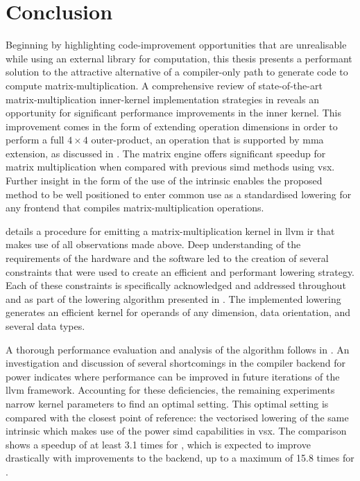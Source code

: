 \documentclass[\main/thesis.tex]{subfiles}
\begin{document}
\chapter{Conclusion}
\label{cha:conclusion}
Beginning by highlighting code-improvement opportunities that are unrealisable while using an external library for computation, this thesis presents a performant solution to the attractive alternative of a compiler-only path to generate code to compute matrix-multiplication.
A comprehensive review of state-of-the-art matrix-multiplication inner-kernel implementation strategies in  reveals an opportunity for significant performance improvements in the inner kernel.
This improvement comes in the form of extending operation dimensions in order to perform a full $4 \times 4$ outer-product, an operation that is supported by  \gls{mma} extension, as discussed in .
The \gls{matrix engine} offers significant speedup for matrix multiplication when compared with previous \gls{simd} methods using \gls{vsx}.
Further insight in the form of the use of the  intrinsic enables the proposed method to be well positioned to enter common use as a standardised \gls{lowering} for any frontend that compiles matrix-multiplication operations.

 details a procedure for emitting a matrix-multiplication kernel in \gls{llvm} \gls{ir} that makes use of all observations made above.
Deep understanding of the requirements of the hardware and the software led to the creation of several constraints that were used to create an efficient and performant \gls{lowering} strategy.
Each of these constraints is specifically acknowledged and addressed throughout  and as part of the \gls{lowering} algorithm presented in .
The implemented lowering generates an efficient kernel for operands of any dimension, data orientation, and several data types.

A thorough performance evaluation and analysis of the algorithm follows in .
An investigation and discussion of several shortcomings in the compiler backend for \gls{power} indicates where performance can be improved in future iterations of the \gls{llvm} framework.
Accounting for these deficiencies, the remaining experiments narrow kernel parameters to find an optimal setting.
This optimal setting is compared with the closest point of reference: the vectorised lowering of the same intrinsic which makes use of the \gls{power}  \gls{simd} capabilities in \gls{vsx}.
The comparison shows a speedup of at least 3.1 times for , which is expected to improve drastically with improvements to the backend, up to a maximum of 15.8 times for .
\end{document}
